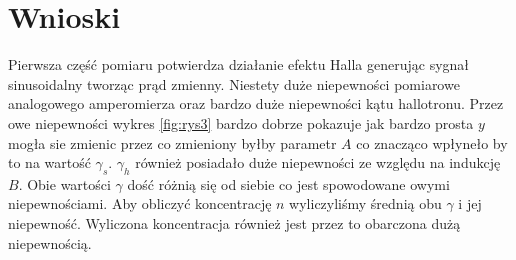 \documentclass{article}
\begin{document}
\section{Wnioski}
Pierwsza część pomiaru potwierdza działanie efektu Halla generując sygnał sinusoidalny tworząc prąd zmienny. Niestety duże niepewności pomiarowe analogowego amperomierza oraz bardzo duże niepewności kątu hallotronu. Przez owe niepewności wykres \ref{fig:rys3} bardzo dobrze pokazuje jak bardzo prosta $y$ mogła sie zmienic przez co zmieniony byłby parametr $A$ co znacząco wpłyneło by to na wartość $\gamma_{s}$. $\gamma_{h}$ również posiadało duże niepewności ze względu na indukcję $B$. Obie wartości $\gamma$ dość różnią się od siebie co jest spowodowane owymi niepewnościami. Aby obliczyć koncentrację $n$ wyliczyliśmy średnią obu $\gamma$ i jej niepewność. Wyliczona koncentracja również jest przez to obarczona dużą niepewnością.
\end{document}
